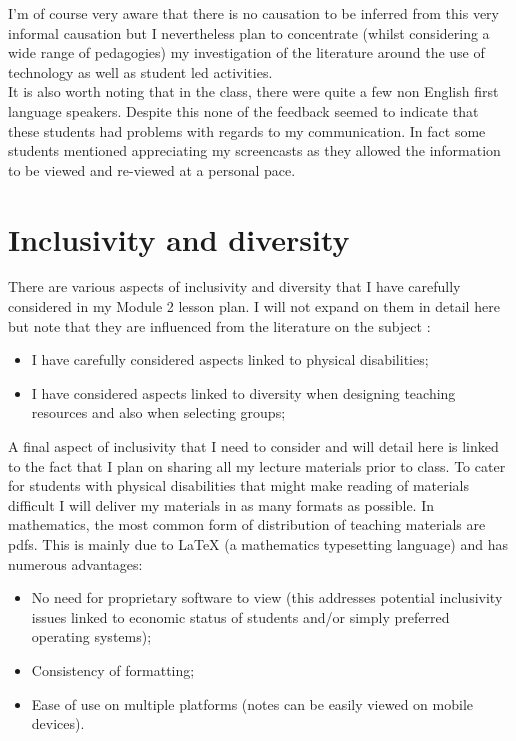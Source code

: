 \documentclass[a4paper,12pt]{article}
\begin{document}
I'm of course very aware that there is no causation to be inferred from this very informal causation but I nevertheless plan to concentrate (whilst considering a wide range of pedagogies) my investigation of the literature around the use of technology as well as student led activities.\\

It is also worth noting that in the class, there were quite a few non English first language speakers. Despite this none of the feedback seemed to indicate that these students had problems with regards to my communication. In fact some students mentioned appreciating my screencasts as they allowed the information to be viewed and re-viewed at a personal pace.

\section{Inclusivity and diversity}

There are various aspects of inclusivity and diversity that I have carefully considered in my Module 2 lesson plan. I will not expand on them in detail here but note that they are influenced from the literature on the subject \cite{Jordan2008a}:

\begin{itemize}
    \item I have carefully considered aspects linked to physical disabilities;
    \item I have considered aspects linked to diversity when designing teaching resources and also when selecting groups;
\end{itemize}

A final aspect of inclusivity that I need to consider and will detail here is linked to the fact that I plan on sharing all my lecture materials prior to class. To cater for students with physical disabilities that might make reading of materials difficult I will deliver my materials in as many formats as possible. In mathematics, the most common form of distribution of teaching materials are pdfs. This is mainly due to LaTeX (a mathematics typesetting language) and has numerous advantages:

\begin{itemize}
    \item No need for proprietary software to view (this addresses potential inclusivity issues linked to economic status of students and/or simply preferred operating systems);
    \item Consistency of formatting;
    \item Ease of use on multiple platforms (notes can be easily viewed on mobile devices).
\end{itemize}
\end{document}
